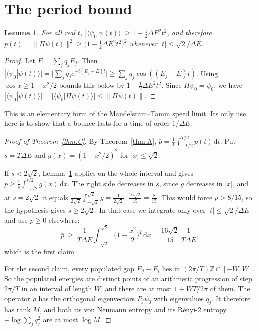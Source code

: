 \documentclass[11pt]{amsart}
\newtheorem{lemma}[theorem]{Lemma}
\theoremstyle{definition}
\newcommand{\ZZ}{\mathbb{Z}}
\newcommand{\dd}{\,\mathrm{d}}
\newcommand{\rb}{\bar\rho}
\begin{document}
\section{The period bound}\label{sec:C}

\begin{lemma}\label{lem:return}
For all real $t$, $|\langle\psi_0|\psi(t)\rangle|\ge1-\tfrac12\Delta E^2t^2$, and therefore $p(t)=\|\Pi\psi(t)\|^2\ge\big(1-\tfrac12\Delta E^2t^2\big)^2$ whenever $|t|\le\sqrt2/\Delta E$.
\end{lemma}

\begin{proof}
Let $\bar E=\sum_jq_jE_j$. Then $|\langle\psi_0|\psi(t)\rangle|=|\sum_jq_je^{-i(E_j-\bar E)t}|\ge\sum_jq_j\cos((E_j-\bar E)t)$. Using $\cos x\ge1-x^2/2$ bounds this below by $1-\tfrac12\Delta E^2t^2$. Since $\Pi\psi_0=\psi_0$, we have $|\langle\psi_0|\psi(t)\rangle|=|\langle\psi_0|\Pi\psi(t)\rangle|\le\|\Pi\psi(t)\|$.
\end{proof}

This is an elementary form of the Mandelstam--Tamm speed limit. Its only use here is to show that a bounce lasts for a time of order $1/\Delta E$.

\begin{proof}[Proof of Theorem~\ref{thm:C}]
By Theorem~\ref{thm:A}, $\bar p=\frac1T\int_{-T/2}^{T/2}p(t)\dd t$. Put $s=T\Delta E$ and $g(x)=(1-x^2/2)^2$ for $|x|\le\sqrt2$.

If $s<2\sqrt2$, Lemma~\ref{lem:return} applies on the whole interval and gives $\bar p\ge\frac1s\int_{-s/2}^{s/2}g(x)\dd x$. The right side decreases in $s$, since $g$ decreases in $|x|$, and at $s=2\sqrt2$ it equals $\frac1{2\sqrt2}\int_{-\sqrt2}^{\sqrt2}g=\frac{1}{2\sqrt2}\cdot\frac{16\sqrt2}{15}=\frac8{15}$. This would force $\bar p>8/15$, so the hypothesis gives $s\ge2\sqrt2$. In that case we integrate only over $|t|\le\sqrt2/\Delta E$ and use $p\ge0$ elsewhere:
\[
\bar p\ \ge\ \frac1{T\Delta E}\int_{-\sqrt2}^{\sqrt2}\Big(1-\frac{x^2}2\Big)^2\dd x=\frac{16\sqrt2}{15}\,\frac1{T\Delta E},
\]
which is the first claim.

For the second claim, every populated gap $E_j-E_l$ lies in $(2\pi/T)\ZZ\cap[-W,W]$. So the populated energies are distinct points of an arithmetic progression of step $2\pi/T$ in an interval of length $W$, and there are at most $1+WT/2\pi$ of them. The operator $\rb$ has the orthogonal eigenvectors $P_j\psi_0$ with eigenvalues $q_j$. It therefore has rank $M$, and both its von Neumann entropy and its R\'enyi-2 entropy $-\log\sum_jq_j^2$ are at most $\log M$.
\end{proof}
\end{document}
